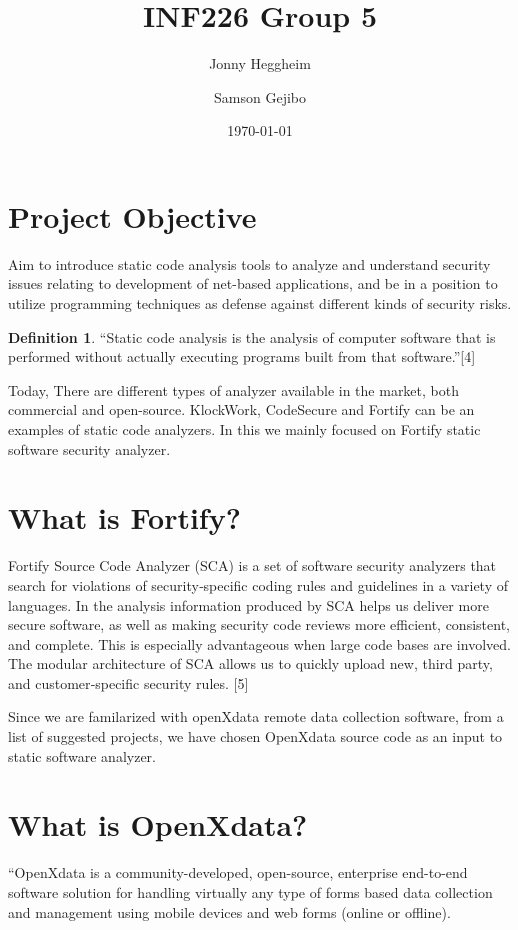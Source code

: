 \documentclass[11pt,a4paper]{article}
\title{INF226 Group 5}
\author{Jonny Heggheim \and Samson Gejibo}
\date{\today}
\theoremstyle{definition}
\newtheorem*{defn}{Definition}
\begin{document}
\maketitle
\newpage
\tableofcontents
\newpage

\lstset{
  language=Java,
  frame=single
}

\section{Project Objective}
Aim to introduce static code analysis tools to analyze and understand security
issues relating to development of net-based applications, and be in a position
to utilize programming techniques as defense against different kinds of
security risks.

\begin{defn}
``Static code analysis is the analysis of computer software that is performed
without actually executing programs built from that software.''[4]
\end{defn}
Today, There are different types of analyzer available in the market,
both commercial and open-source. KlockWork, CodeSecure and Fortify can be an
examples of static code analyzers.
In this we mainly focused on Fortify static software security analyzer.


\section{What is Fortify?}
Fortify Source Code Analyzer (SCA) is a set of software security analyzers that
 search for violations of security‐specific coding rules and guidelines in a 
 variety of languages. In the analysis information produced by SCA helps us deliver
 more secure software, as well as making security code reviews more efficient, 
 consistent, and complete. This is especially advantageous when large code bases 
 are involved. The modular architecture of SCA allows us to quickly upload new, 
 third party, and customer‐specific security rules. [5]

Since we are familarized with openXdata remote data collection software, from a list 
of  suggested projects, we have chosen OpenXdata source code as an input to 
static software analyzer. 


\section{What is OpenXdata?}
“OpenXdata is a community-developed, open-source, enterprise end-to-end
software solution for handling virtually any type of forms based data
collection and management using mobile devices and web forms
(online or offline).
\end{document}
